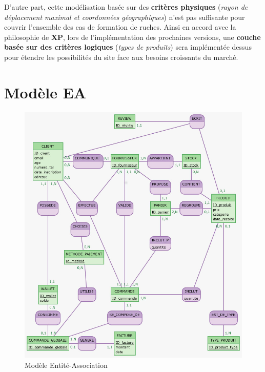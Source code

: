 \documentclass[a4paper,12pt]{book}
\theoremstyle{break}
\theoremstyle{break}
\theoremstyle{break}
\theoremstyle{break}
\theoremstyle{definition}
\theoremstyle{remark}
\begin{document}
D'autre part, cette modélisation basée sur des \textbf{critères physiques} (\textit{rayon de déplacement maximal et coordonnées géographiques}) n'est pas suffisante pour couvrir l'ensemble des cas de formation de ruches. Ainsi en accord avec la philosophie de \textbf{XP}, lors de l'implémentation des prochaines versions, une \textbf{couche basée sur des critères logiques} (\textit{types de produits}) sera implémentée dessus pour étendre les possibilités du site face aux besoins croissants du marché.
\section{Modèle EA}
  \begin{figure}[h!]
    \includegraphics[scale=0.6]{images/Clients.jpg}

    \caption{Modèle Entité-Association}
    \label{fig:modele_EA}
  \end{figure}

\newpage
\end{document}
